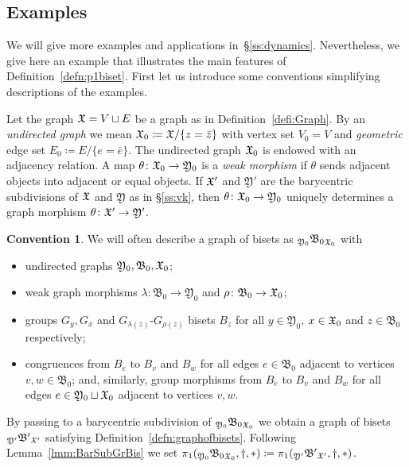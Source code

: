 \documentclass{amsart}
\begin{document}
\subsection{Examples}\label{ss:examplesgfgps}
We will give more examples and applications
in~\S\ref{ss:dynamics}. Nevertheless, we give here an example that
illustrates the main features of Definition~\ref{defn:p1biset}. First let
us introduce some conventions simplifying descriptions of the examples.

Let the graph ${\mathfrak X}=V\sqcup E$ be a graph as in
Definition~\ref{defi:Graph}. By an \emph{undirected graph} we mean
${\mathfrak X}_0\coloneqq {\mathfrak X}/\{z=\bar z\}$ with vertex set $V_0=V$ and \emph{geometric} edge set
$E_0\coloneqq E/\{e=\bar e\}$. The undirected graph ${\mathfrak X}_0$ is endowed with
an adjacency relation. A map $\theta\colon{\mathfrak X}_0\to\mathfrak Y_0$ is a
\emph{weak morphism} if $\theta$ sends adjacent objects into adjacent or
equal objects. If ${\mathfrak X}'$ and $\mathfrak Y'$ are the barycentric
subdivisions of ${\mathfrak X}$ and $ \mathfrak Y$ as in \S\ref{ss:vk}, then
$\theta\colon{\mathfrak X}_0\to\mathfrak Y_0$ uniquely determines a graph morphism
$\theta\colon{\mathfrak X}'\to\mathfrak Y'$.

\theoremstyle{definition}\newtheorem*{convention}{Convention}
\begin{convention}
  We will often describe a graph of bisets as ${}_{\mathfrak Y_0}{
    \mathfrak B_0 }_{{\mathfrak X}_0}$ with
  \begin{itemize}
  \item undirected graphs ${\mathfrak Y_0},{ \mathfrak B_0 },{{\mathfrak X}_0}$;
  \item weak graph morphisms $\lambda\colon \mathfrak B_0\to\mathfrak Y_0$
    and $\rho \colon \mathfrak B_0\to{\mathfrak X}_0$;
  \item groups $G_y,G_x$ and $G_{\lambda(z)}$-$G_{\rho(z)}$ bisets $B_z$
    for all $y\in \mathfrak Y_0$, $x\in {\mathfrak X}_0$ and $z\in \mathfrak B_0$
    respectively;
  \item congruences from $B_e$ to $B_v$ and $B_w$ for all edges $e\in
    \mathfrak B_0$ adjacent to vertices $v,w\in \mathfrak B_0$; and,
    similarly, group morphisms from $B_e$ to $B_v$ and $B_w$ for all edges
    $e\in \mathfrak Y_0\sqcup {\mathfrak X}_0$ adjacent to vertices $v,w$.
  \end{itemize}
  By passing to a barycentric subdivision of ${}_{\mathfrak Y_0}{ \mathfrak
    B_0 }_{{\mathfrak X}_0}$ we obtain a graph of bisets ${}_{\mathfrak Y'}{
    \mathfrak B' }_{{\mathfrak X}'}$ satisfying
  Definition~\ref{defn:graphofbisets}. Following
  Lemma~\ref{lmm:BarSubGrBis} we set $\pi_1({}_{\mathfrak Y_0}{ \mathfrak
    B_0 }_{{\mathfrak X}_0}, \dagger, *)\coloneqq\pi_1({}_{\mathfrak Y'}{ \mathfrak
    B' }_{{\mathfrak X}'}, \dagger, *)$.
\end{convention}
\end{document}
